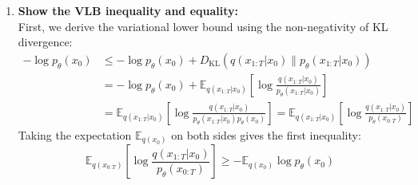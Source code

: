 \documentclass{article}
\begin{document}
{\begin{enumerate}
\begin{align*}
            \tilde{\mu}_t &= \frac{\sqrt{\alpha_t}(1 - \bar{\alpha}_{t-1})}{1 - \bar{\alpha}_t} x_t + \frac{\sqrt{\bar{\alpha}_{t-1}}(1 - \alpha_t)}{1 - \bar{\alpha}_t} \left( \frac{x_t - \sqrt{1 - \bar{\alpha}_t}\epsilon}{\sqrt{\alpha_t} \sqrt{\bar{\alpha}_{t-1}}} \right) \\
            &= \left( \frac{\alpha_t(1 - \bar{\alpha}_{t-1}) + 1 - \alpha_t}{\sqrt{\alpha_t}(1 - \bar{\alpha}_t)} \right) x_t - \frac{1 - \alpha_t}{\sqrt{\alpha_t} \sqrt{1 - \bar{\alpha}_t}} \epsilon \\
            &= \frac{1}{\sqrt{\alpha_t}} x_t - \frac{1 - \alpha_t}{\sqrt{\alpha_t} \sqrt{1 - \bar{\alpha}_t}} \epsilon = \frac{1}{\sqrt{\alpha_t}} \left( x_t - \frac{1 - \alpha_t}{\sqrt{1 - \bar{\alpha}_t}} \epsilon \right)
        \end{align*}

        \item \textbf{Show the VLB inequality and equality:} \\
        First, we derive the variational lower bound using the non-negativity of KL divergence:
        \begin{align*}
            -\log p_\theta(x_0) &\leq -\log p_\theta(x_0) + D_{\mathrm{KL}}(q(x_{1:T}|x_0) \| p_\theta(x_{1:T}|x_0)) \\
            &= -\log p_\theta(x_0) + \mathbb{E}_{q(x_{1:T}|x_0)} \left[ \log \frac{q(x_{1:T}|x_0)}{p_\theta(x_{1:T}|x_0)} \right] \\
            &= \mathbb{E}_{q(x_{1:T}|x_0)} \left[ \log \frac{q(x_{1:T}|x_0)}{p_\theta(x_{1:T}|x_0) p_\theta(x_0)} \right] = \mathbb{E}_{q(x_{1:T}|x_0)} \left[ \log \frac{q(x_{1:T}|x_0)}{p_\theta(x_{0:T})} \right]
        \end{align*}
        Taking the expectation $\mathbb{E}_{q(x_0)}$ on both sides gives the first inequality:
        \begin{equation*}
            \mathbb{E}_{q(x_{0:T})} \left[ \log \frac{q(x_{1:T}|x_0)}{p_\theta(x_{0:T})} \right] \geq -\mathbb{E}_{q(x_0)} \log p_\theta(x_0)
        \end{equation*}


\end{enumerate}}
\end{document}
